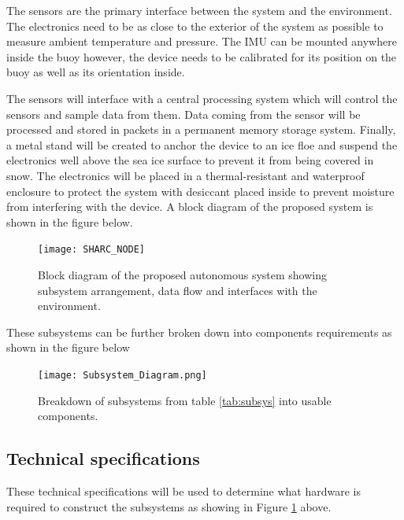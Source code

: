 The sensors are the primary interface between the system and the environment. The electronics need to be as close to the exterior of the system as possible to measure ambient temperature and pressure. The IMU can be mounted anywhere inside the buoy however, the device needs to be calibrated for its position on the buoy as well as its orientation inside. \par

The sensors will interface with a central processing system which will control the sensors and sample data from them. Data coming from the sensor will be processed and stored in packets in a permanent memory storage system. Finally, a metal stand will be created to anchor the device to an ice floe and suspend the electronics well above the sea ice surface to prevent it from being covered in snow. The electronics will be placed in a thermal-resistant and waterproof enclosure to protect the system with desiccant placed inside to prevent moisture from interfering with the device. A block diagram of the proposed system is shown in the figure below.

\begin{figure}[H]
    \centering
    \texttt{[image: SHARC\_NODE]}
    \caption{Block diagram of the proposed autonomous system showing subsystem arrangement, data flow and interfaces with the environment.}
    \label{mbuoy}
\end{figure}

These subsystems can be further broken down into components requirements as shown in the figure below

\begin{figure}[H]
    \centering
    \texttt{[image: Subsystem\_Diagram.png]}
    \caption{Breakdown of subsystems from table \ref{tab:subsys} into usable components.}
    \label{fig:ss_breakdown}
\end{figure}



\subsection{Technical specifications}

These technical specifications will be used to determine what hardware is required to construct the subsystems as showing in Figure \ref{mbuoy} above.


